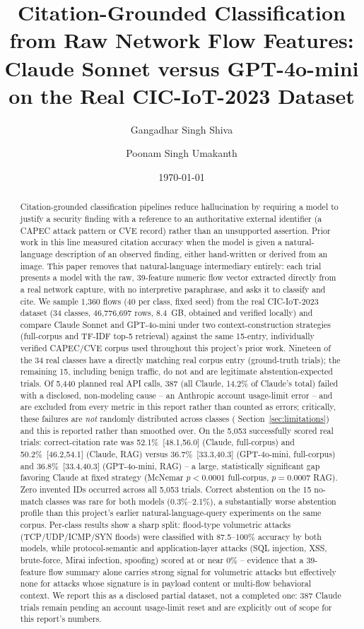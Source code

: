 \documentclass[11pt]{article}
\title{Citation-Grounded Classification from Raw Network Flow Features:\\
Claude Sonnet versus GPT-4o-mini on the Real CIC-IoT-2023 Dataset}
\author{Gangadhar Singh Shiva \and Poonam Singh Umakanth}
\date{\today}
\begin{document}
\maketitle

\begin{abstract}
Citation-grounded classification pipelines reduce hallucination by requiring
a model to justify a security finding with a reference to an authoritative
external identifier (a CAPEC attack pattern or CVE record) rather than an
unsupported assertion. Prior work in this line measured citation accuracy
when the model is given a natural-language description of an observed
finding, either hand-written or derived from an image. This paper removes
that natural-language intermediary entirely: each trial presents a model
with the raw, 39-feature numeric flow vector extracted directly from a real
network capture, with no interpretive paraphrase, and asks it to classify
and cite. We sample 1,360 flows (40 per class, fixed seed) from the real
CIC-IoT-2023 dataset (34 classes, 46{,}776{,}697 rows, 8.4~GB, obtained and
verified locally) and compare Claude Sonnet and GPT-4o-mini under two
context-construction strategies (full-corpus and TF-IDF top-5 retrieval)
against the same 15-entry, individually verified CAPEC/CVE corpus used
throughout this project's prior work. Nineteen of the 34 real classes have
a directly matching real corpus entry (ground-truth trials); the remaining
15, including benign traffic, do not and are legitimate
abstention-expected trials. Of 5,440 planned real API calls, 387 (all
Claude, 14.2\% of Claude's total) failed with a disclosed, non-modeling
cause -- an Anthropic account usage-limit error -- and are excluded from
every metric in this report rather than counted as errors; critically,
these failures are \emph{not} randomly distributed across classes (
Section~\ref{sec:limitations}) and this is reported rather than smoothed
over. On the 5,053 successfully scored real trials: correct-citation rate
was 52.1\%~[48.1,56.0] (Claude, full-corpus) and 50.2\%~[46.2,54.1] (Claude,
RAG) versus 36.7\%~[33.3,40.3] (GPT-4o-mini, full-corpus) and
36.8\%~[33.4,40.3] (GPT-4o-mini, RAG) -- a large, statistically significant
gap favoring Claude at fixed strategy (McNemar $p<0.0001$ full-corpus,
$p=0.0007$ RAG). Zero invented IDs occurred across all 5,053 trials. Correct
abstention on the 15 no-match classes was rare for both models
(0.3\%--2.1\%), a substantially worse abstention profile than this
project's earlier natural-language-query experiments on the same corpus.
Per-class results show a sharp split: flood-type volumetric attacks
(TCP/UDP/ICMP/SYN floods) were classified with 87.5--100\% accuracy by both
models, while protocol-semantic and application-layer attacks (SQL
injection, XSS, brute-force, Mirai infection, spoofing) scored at or near
0\% -- evidence that a 39-feature flow summary alone carries strong signal
for volumetric attacks but effectively none for attacks whose signature is
in payload content or multi-flow behavioral context. We report this as a
disclosed partial dataset, not a completed one: 387 Claude trials remain
pending an account usage-limit reset and are explicitly out of scope for
this report's numbers.
\end{abstract}
\end{document}
